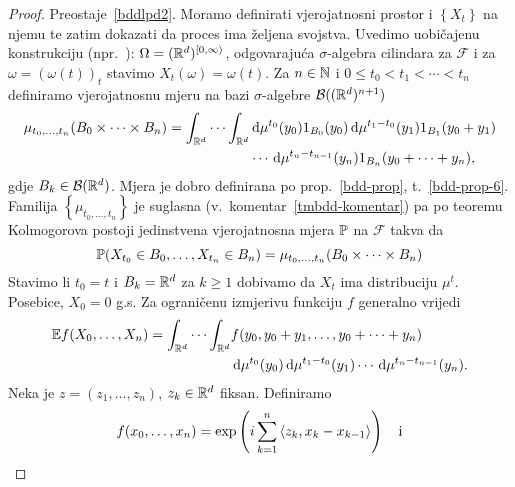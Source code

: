 \documentclass[main.tex]{subfiles}
\begin{document}
\begin{proof}
	Preostaje~\ref{bddlpd2}. Moramo definirati vjerojatnosni prostor i \( \left\{ X_t \right\} \) na njemu te zatim dokazati da proces ima željena svojstva.
	Uvedimo uobičajenu konstrukciju (npr.~\cite[str.~4]{sato}): \( \Omega = (\R^d)^{\left[0, \infty \right\rangle} \), odgovarajuća \( \sigma \)-algebra
	cilindara za \( \mathcal F \) i za \( \omega=(\omega(t))_t \) stavimo \( X_t(\omega)=\omega(t) \). Za
	\( n \in \N \) i \( 0 \le t_0 < t_1 < \cdots < t_n \) definiramo vjerojatnosnu mjeru na bazi \( \sigma \)-algebre \(\mathcal B((\R^d)^{n+1})  \)
	\begin{equation} \label{tmbdd-mjera}
		\begin{aligned}
			\mu_{t_0, \ldots, t_n}(B_0 \times \cdots \times B_n) =
			\int_{\R^d} \cdots \int_{\R^d} & \D \mu^{t_0}(y_0) 1_{B_0}(y_0)
			\D \mu^{t_1-t_0}(y_1)1_{B_1}(y_0+y_1)                           \\ &\cdots
			\D \mu^{t_n-t_{n-1}}(y_n)1_{B_n}(y_0+\cdots+y_n),
		\end{aligned}
	\end{equation}
	gdje \( B_k \in \mathcal B(\R^d) \). Mjera je dobro definirana po prop.~\ref{bdd-prop}, t.~\ref{bdd-prop-6}. Familija \( \left\{ \mu_{t_0,\ldots,t_n} \right\} \)
	je suglasna (v.\ komentar~\ref{tmbdd-komentar}) pa po teoremu Kolmogorova postoji jedinstvena vjerojatnosna mjera \( \P \) na \( \mathcal F \) takva da
	\begin{equation}
		\P(X_{t_0} \in B_0, \ldots , X_{t_n} \in B_n) = \mu_{t_0, \ldots, t_n}(B_0 \times \cdots \times B_n)
	\end{equation}
	Stavimo li \( t_0 = t \) i \( B_k = \R^d \) za \( k \ge 1 \) dobivamo da \( X_t \) ima distribuciju \( \mu^t \). Posebice, \( X_0 = 0 \) g.s. Za ograničenu izmjerivu funkciju \( f \) generalno vrijedi
	\begin{equation} \label{eq:tmbddef}
		\begin{aligned}
			\E f(X_0, \ldots, X_n) = \int_{\R^d} \cdots \int_{\R^d} & f(y_0, y_0+y_1, \ldots, y_0+\cdots+y_n)
			\\ & \D \mu^{t_0}(y_0) \D \mu^{t_1-t_0}(y_1) \cdots \D \mu^{t_n-t_{n-1}}(y_n).
		\end{aligned}
	\end{equation}
	Neka je \( z = (z_1, \ldots, z_n) \), \( z_k \in \R^d \) fiksan. Definiramo
	\begin{equation}
		\begin{aligned}
			 & f(x_0, \ldots, x_n) = \exp\left( i \sum_{k=1}^n \skp{z_k}{x_k-x_{k-1}}  \right)
			\quad \mathrm{i}                                                                              \\

\end{aligned}
\end{equation}
\end{proof}
\end{document}
